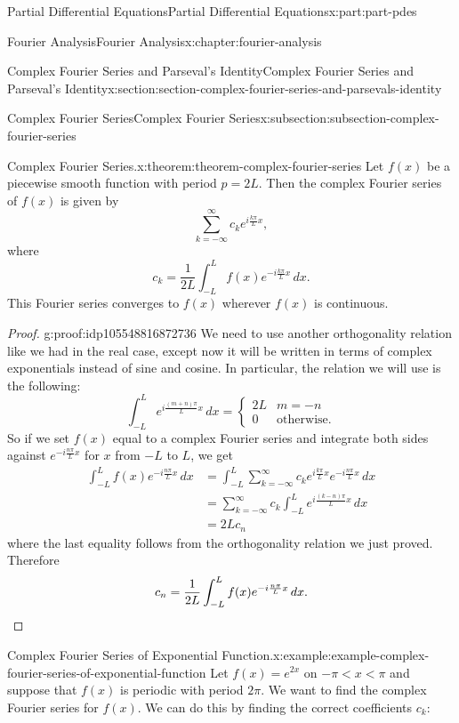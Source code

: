 \documentclass[twoside,10pt,]{book}
\numberwithin{equation}{part}
\newcommand{\qedhere}{\relax}
\newcommand{\amp}{&}
\begin{document}
\begin{partptx}{Partial Differential Equations}{}{Partial Differential Equations}{}{}{x:part:part-pdes}
\begin{chapterptx}{Fourier Analysis}{}{Fourier Analysis}{}{}{x:chapter:fourier-analysis}
\begin{sectionptx}{Complex Fourier Series and Parseval's Identity}{}{Complex Fourier Series and Parseval's Identity}{}{}{x:section:section-complex-fourier-series-and-parsevals-identity}
\begin{subsectionptx}{Complex Fourier Series}{}{Complex Fourier Series}{}{}{x:subsection:subsection-complex-fourier-series}
\begin{theorem}{Complex Fourier Series.}{}{x:theorem:theorem-complex-fourier-series}
%
Let \(f(x)\) be a piecewise smooth function with period \(p=2L\). Then the complex Fourier series of \(f(x)\) is given by%
\begin{equation*}
\sum_{k=-\infty}^{\infty}c_{k}e^{i\frac{k\pi}{L}x},
\end{equation*}
where%
\begin{equation*}
c_{k} = \frac{1}{2L}\int_{-L}^{L}f(x)e^{-i\frac{k\pi}{L}x}\,dx.
\end{equation*}
This Fourier series converges to \(f(x)\) wherever \(f(x)\) is continuous.%
\end{theorem}
\begin{proof}{}{g:proof:idp105548816872736}
We need to use another orthogonality relation like we had in the real case, except now it will be written in terms of complex exponentials instead of sine and cosine. In particular, the relation we will use is the following:%
\begin{equation*}
\int_{-L}^{L}e^{i\frac{(m+n)\pi}{L}x}\,dx = \begin{cases} 2L \amp m=-n \\ 0 \amp \text{otherwise.}\end{cases}
\end{equation*}
So if we set \(f(x)\) equal to a complex Fourier series and integrate both sides against \(e^{-i\frac{n\pi}{L}x}\) for \(x\) from \(-L\) to \(L\), we get%
\begin{align*}
\int_{-L}^{L}f(x)e^{-i\frac{n\pi}{L}x}\,dx \amp = \int_{-L}^{L}\sum_{k=-\infty}^{\infty}c_{k}e^{i\frac{k\pi}{L}x}e^{-i\frac{n\pi}{L}x}\,dx \\
\amp= \sum_{k=-\infty}^{\infty}c_{k}\int_{-L}^{L}e^{i\frac{(k-n)\pi}{L}x}\,dx\\
\amp= 2Lc_{n}
\end{align*}
where the last equality follows from the orthogonality relation we just proved. Therefore%
\begin{equation*}
c_{n} = \frac{1}{2L}\int_{-L}^{L}f(x)e^{-i\frac{n\pi}{L}x}\,dx.\qedhere
\end{equation*}
%
\end{proof}
\begin{example}{Complex Fourier Series of Exponential Function.}{x:example:example-complex-fourier-series-of-exponential-function}%
Let \(f(x) = e^{2x}\) on \(-\pi<x<\pi\) and suppose that \(f(x)\) is periodic with period \(2\pi\). We want to find the complex Fourier series for \(f(x)\). We can do this by finding the correct coefficients \(c_{k}\):%
\begin{align*}

\end{align*}
\end{example}
\end{subsectionptx}
\end{sectionptx}
\end{chapterptx}
\end{partptx}
\end{document}
